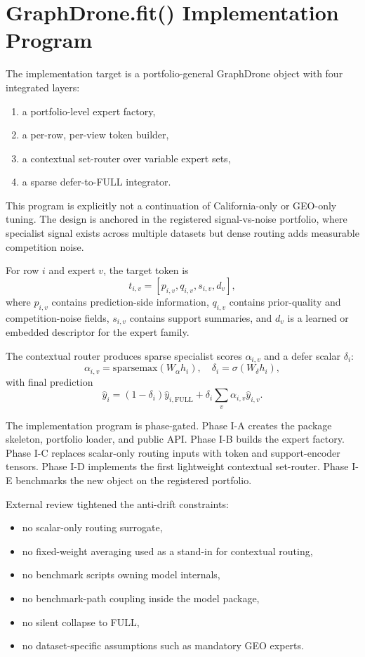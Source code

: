 \section{GraphDrone.fit() Implementation Program}

The implementation target is a portfolio-general GraphDrone object with four integrated layers:
\begin{enumerate}
\item a portfolio-level expert factory,
\item a per-row, per-view token builder,
\item a contextual set-router over variable expert sets,
\item a sparse defer-to-FULL integrator.
\end{enumerate}

This program is explicitly not a continuation of California-only or GEO-only tuning. The design is anchored in the registered signal-vs-noise portfolio, where specialist signal exists across multiple datasets but dense routing adds measurable competition noise.

For row $i$ and expert $v$, the target token is
\[
t_{i,v} = [p_{i,v}, q_{i,v}, s_{i,v}, d_v],
\]
where $p_{i,v}$ contains prediction-side information, $q_{i,v}$ contains prior-quality and competition-noise fields, $s_{i,v}$ contains support summaries, and $d_v$ is a learned or embedded descriptor for the expert family.

The contextual router produces sparse specialist scores $\alpha_{i,v}$ and a defer scalar $\delta_i$:
\[
\alpha_{i,v} = \mathrm{sparsemax}(W_\alpha h_i), \quad
\delta_i = \sigma(W_\delta h_i),
\]
with final prediction
\[
\hat y_i = (1 - \delta_i)\hat y_{i,\mathrm{FULL}} + \delta_i \sum_v \alpha_{i,v}\hat y_{i,v}.
\]

The implementation program is phase-gated. Phase I-A creates the package skeleton, portfolio loader, and public API. Phase I-B builds the expert factory. Phase I-C replaces scalar-only routing inputs with token and support-encoder tensors. Phase I-D implements the first lightweight contextual set-router. Phase I-E benchmarks the new object on the registered portfolio.

External review tightened the anti-drift constraints:
\begin{itemize}
\item no scalar-only routing surrogate,
\item no fixed-weight averaging used as a stand-in for contextual routing,
\item no benchmark scripts owning model internals,
\item no benchmark-path coupling inside the model package,
\item no silent collapse to FULL,
\item no dataset-specific assumptions such as mandatory GEO experts.
\end{itemize}


